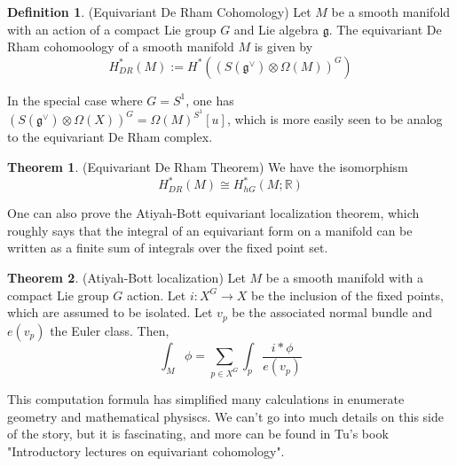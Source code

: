 \documentclass{article}
\theoremstyle{definition}
\newtheorem{theorem}{Theorem}[section]
\theoremstyle{definition}
\newtheorem{definition}{Definition}[theorem]
\theoremstyle{definition}
\theoremstyle{definition}
\theoremstyle{definition}
\theoremstyle{definition}
\theoremstyle{definition}
\begin{document}
\begin{tcolorbox}[colback=purple!5!white,colframe=purple!75!black]
\begin{definition}
(Equivariant De Rham Cohomology) Let $M$ be a smooth manifold with an action of a compact Lie group $G$ and Lie algebra $\mathfrak{g}$. The equivariant De Rham cohomoology of a smooth manifold $M$ is given by 
\[H^*_{DR}(M):=H^*((S(\mathfrak{g}^{\vee})\otimes \Omega(M))^{G})\]
\end{definition}
\end{tcolorbox}
In the special case where $G=S^1$, one has $(S(\mathfrak{g}^{\vee})\otimes \Omega(X))^{G}=\Omega(M)^{S^1}[u]$, which is more easily seen to be analog to the equivariant De Rham complex. 

\begin{tcolorbox}[colback=red!5!white,colframe=red!30!white]
\begin{theorem}
(Equivariant De Rham Theorem) We have the isomorphism
\[H^*_{DR}(M)\cong H^*_{hG}(M; \mathbb{R})\]
\end{theorem}
\end{tcolorbox}
One can also prove the Atiyah-Bott equivariant localization theorem, which roughly says that the integral of an equivariant form on a manifold can be written as a finite sum of integrals over the fixed point set.


\begin{tcolorbox}[colback=red!5!white,colframe=red!30!white]
\begin{theorem}
(Atiyah-Bott localization) Let $M$ be a smooth manifold with a compact Lie group $G$ action. Let $i: X^G\to X$ be the inclusion of the fixed points, which are assumed to be isolated. Let $v_p$ be the associated normal bundle and $e(v_p)$ the Euler class. Then, 
\[\int_M \phi=\sum_{p\in X^G}\int_{p}\frac{i*\phi}{e(v_p)}\]
\end{theorem}
\end{tcolorbox}

This computation formula has simplified many calculations in enumerate geometry and mathematical physiscs.  We can't go into much details on this side of the story, but it is fascinating, and more can be found in Tu's book "Introductory lectures on equivariant cohomology". 
\end{document}
